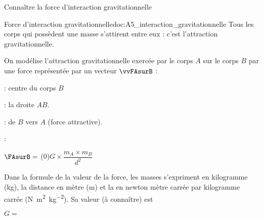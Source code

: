 \teteSndMouv

\nomPrenomClasse
{}

\begin{objectifs}
  \item Connaître la force d'interaction gravitationnelle
\end{objectifs}



\begin{doc}{Force d'interaction gravitationnelle}{doc:A5_interaction_gravitationnelle}
  \chevron Tous les corps qui possèdent une masse s’attirent entre eux : c’est l’attraction gravitationnelle.
  \begin{importants}
    On modélise l'attraction gravitationnelle exercée par le corps $A$ sur le corps $B$ par une force représentée par un vecteur $\vvFAsurB$ :
    
    \vspace*{-12pt}
    \begin{wrapfigure}[6]{r}{0.4\linewidth}
      \vspace*{-10pt}
      
    \end{wrapfigure}
    \phantom{b}
    
    \begin{listePoints}
      \item {} : centre du corps $B$
      \item {} : la droite $AB$.
      \item {} : de $B$ vers $A$ (force attractive).
      \item {} : 
    \end{listePoints}
    \begin{center}
      $\FAsurB =$ \texteTrou(0){$G\times \dfrac{m_A \times m_B}{d^2}$}
    \end{center}
      
    Dans la formule de la valeur de la force, les masses s'expriment en kilogramme (\unit{\kg}),
    la distance en mètre (\unit{\m}) et
    la  en newton mètre carrée par kilogramme carrée (\unit{\newton \m\squared \per\kg\squared}).
    Sa valeur (à connaître) est 
    \begin{center}
      $G =$ 
    \end{center}
  \end{importants}
\end{doc}


